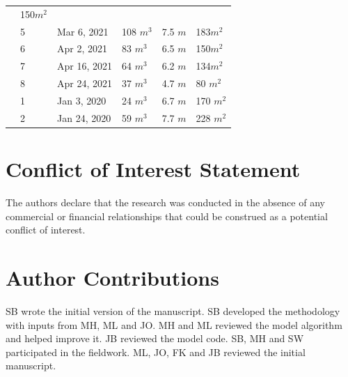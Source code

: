 \documentclass[utf8]{frontiersSCNS} %
\begin{document}
\begin{table}
\begin{tabular}{@{}|llllll|@{}}
		                       & 150$m^{2}$                                                                       \\
		\multicolumn{1}{|l|}{} & 5            & Mar 6, 2021   & 108 $m^{3}$     & 7.5 $m$
		                       & 183$m^{2}$                                                                       \\
		\multicolumn{1}{|l|}{} & 6            & Apr 2, 2021   & 83 $m^{3}$      & 6.5 $m$
		                       & 150$m^{2}$                                                                       \\
		\multicolumn{1}{|l|}{} & 7            & Apr 16, 2021  & 64 $m^{3}$      & 6.2 $m$
		                       & 134$m^{2}$                                                                       \\
		\multicolumn{1}{|l|}{} & 8            & Apr 24, 2021  & 37 $m^{3}$      & 4.7 $m$
		                       & 80 $m^{2}$                                                                       \\
		\midrule
		\multicolumn{1}{|l|}{\multirow{2}{*}{\rotatebox[origin=c]{90}{CH20}}}
		                       & 1            & Jan 3, 2020   & 24 $m^{3}$      & 6.7 $m$
		                       & 170 $m^{2}$                                                                      \\
		\multicolumn{1}{|l|}{} & 2            & Jan 24, 2020  & 59 $m^{3}$      & 7.7 $m$
		                       & 228 $m^{2}$                                                                      \\
		\midrule
	\end{tabular}

\end{table}


\section*{Conflict of Interest Statement} The authors declare that the research was conducted in the absence of any
commercial or financial relationships that could be construed as a potential conflict of interest.

\section*{Author Contributions} SB wrote the initial version of the manuscript. SB developed the methodology with
inputs from MH, ML and JO. MH and ML reviewed the model algorithm and helped improve it. JB reviewed the model
code.  SB, MH and SW participated in the fieldwork. ML, JO, FK and JB reviewed the initial manuscript.
\end{document}
